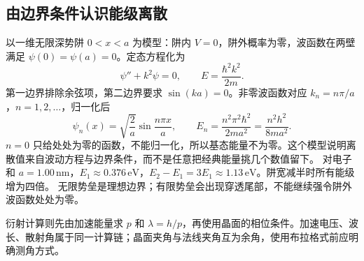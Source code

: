 \subsection{由边界条件认识能级离散}
以一维无限深势阱 $0<x<a$ 为模型：阱内 $V=0$，阱外概率为零，波函数在两壁满足 $\psi(0)=\psi(a)=0$。定态方程化为
\[
 \psi''+k^2\psi=0,\qquad E=\frac{\hbar^2k^2}{2m}.
\]
第一边界排除余弦项，第二边界要求 $\sin(ka)=0$。非零波函数对应 $k_n=n\pi/a$，$n=1,2,\ldots$，归一化后
\[
 \psi_n(x)=\sqrt{\frac2a}\sin\frac{n\pi x}{a},\qquad
 E_n=\frac{n^2\pi^2\hbar^2}{2ma^2}=\frac{n^2h^2}{8ma^2}.
\]
$n=0$ 只给处处为零的函数，不能归一化，所以基态能量不为零。这个模型说明离散值来自波动方程与边界条件，而不是任意把经典能量挑几个数值留下。
对电子和 $a=1.00\,\mathrm{nm}$，$E_1\approx0.376\,\mathrm{eV}$，$E_2-E_1=3E_1\approx1.13\,\mathrm{eV}$。阱宽减半时所有能级增为四倍。
无限势垒是理想边界；有限势垒会出现穿透尾部，不能继续强令阱外波函数处处为零。

衍射计算则先由加速能量求 $p$ 和 $\lambda=h/p$，再使用晶面的相位条件。加速电压、波长、散射角属于同一计算链；晶面夹角与法线夹角互为余角，使用布拉格式前应明确测角方式。
